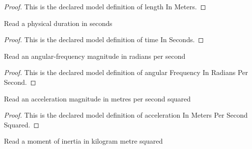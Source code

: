 \begin{proof}
  This is the declared model definition of length In Meters.
\end{proof}
\begin{definition}
  \label{def:physics:phyx-mini-0263:phyxminiproblems-problemphyxmini0263-timeinseconds}
  Read a physical duration in seconds
\end{definition}
\begin{proof}
  This is the declared model definition of time In Seconds.
\end{proof}
\begin{definition}
  \label{def:physics:phyx-mini-0263:phyxminiproblems-problemphyxmini0263-angularfrequencyinradianspersecond}
  Read an angular-frequency magnitude in radians per second
\end{definition}
\begin{proof}
  This is the declared model definition of angular Frequency In Radians Per Second.
\end{proof}
\begin{definition}
  \label{def:physics:phyx-mini-0263:phyxminiproblems-problemphyxmini0263-accelerationinmeterspersecondsquared}
  Read an acceleration magnitude in metres per second squared
\end{definition}
\begin{proof}
  This is the declared model definition of acceleration In Meters Per Second Squared.
\end{proof}
\begin{definition}
  \label{def:physics:phyx-mini-0263:phyxminiproblems-problemphyxmini0263-momentofinertiainkilogrammeterssquared}
  Read a moment of inertia in kilogram metre squared
\end{definition}
